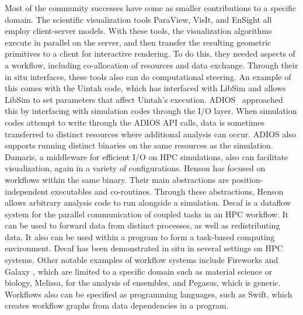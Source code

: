 \begin{refsection}
Most of the community successes have come as smaller contributions to a specific domain.
The scientific visualization tools ParaView, VisIt, and EnSight all employ client-server models.  With these tools, the visualization algorithms execute in parallel on the server, and then transfer the resulting geometric primitives to a client for interactive rendering.  To do this, they needed aspects of a workflow, including co-allocation of resources and data exchange.  Through their in situ interfaces, these tools also can do computational steering.  An example of this comes with the Uintah code, which has interfaced with LibSim and allows LibSim to set parameters that affect Uintah’s execution.
ADIOS~\cite{Lofstead08} approached this by interfacing with simulation codes through the I/O layer.  When simulation codes attempt to write through the ADIOS API calls, data is sometimes transferred to distinct resources where additional analysis can occur.  ADIOS also supports running distinct binaries on the same resources as the simulation.  Damaris, a middleware for efficient I/O on HPC simulations, also can facilitate visualization, again in a variety of configurations.
Henson has focused on workflows within the same binary.  Their main abstractions are position-independent executables and co-routines.  Through these abstractions, Henson allows arbitrary analysis code to run alongside a simulation.
Decaf is a dataflow system for the parallel communication of coupled tasks in an HPC workflow.   It can be used to forward data from distinct processes, as well as redistributing data.  It also can be used within a program to form a task-based computing environment.  Decaf has been demonstrated in situ in several settings on HPC systems.  Other notable examples of workflow systems include Fireworks \cite{Jain15} and Galaxy \cite{Afgan11}, which are limited to a specific domain such as material science or biology, Melissa, for the analysis of ensembles, and Pegasus, which is generic.  Workflows also can be specified as programming languages, such as Swift, which creates workflow graphs from data dependencies in a program.


\end{refsection}
